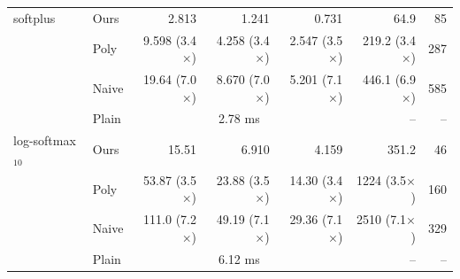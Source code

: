 \begin{table}[t]
\begin{tabular}{llrrrrr}
\midrule
softplus & \textsf{Ours} & 2.813 & 1.241 & 0.731 & 64.9 & 85\\
 & \textsf{Poly} & 9.598 (3.4$\times$) & 4.258 (3.4$\times$) & 2.547 (3.5$\times$) & 219.2 (3.4$\times$) & 287\\
 & \textsf{Naive} & 19.64 (7.0$\times$) & 8.670 (7.0$\times$) & 5.201 (7.1$\times$) & 446.1 (6.9$\times$) & 585\\
 & \textsf{Plain} & \multicolumn{3}{c}{2.78 ms} & -- & --\\
\midrule
log-softmax$_{10}$ & \textsf{Ours} & 15.51 & 6.910 & 4.159 & 351.2 & 46\\
 & \textsf{Poly} & 53.87 (3.5$\times$) & 23.88 (3.5$\times$) & 14.30 (3.4$\times$) & 1224 (3.5$\times$) & 160\\
 & \textsf{Naive} & 111.0 (7.2$\times$) & 49.19 (7.1$\times$) & 29.36 (7.1$\times$) & 2510 (7.1$\times$) & 329\\
 & \textsf{Plain} & \multicolumn{3}{c}{6.12 ms} & -- & --\\
\bottomrule
\end{tabular}
\end{table}

